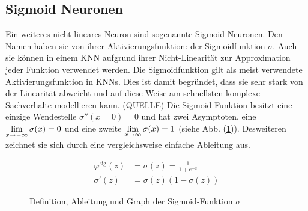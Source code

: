 \subsection{Sigmoid Neuronen}
Ein weiteres nicht-lineares Neuron sind sogenannte Sigmoid-Neuronen.
Den Namen haben sie von ihrer Aktivierungsfunktion: der Sigmoidfunktion $\sigma$.
\para{}
Auch sie können in einem KNN aufgrund ihrer Nicht-Linearität zur Approximation jeder Funktion
verwendet werden. Die Sigmoidfunktion gilt als meist verwendete
Aktivierungsfunktion in KNNs. Dies ist damit begründet, dass sie sehr stark von
der Linearität abweicht und auf diese Weise am schnellsten komplexe Sachverhalte
modellieren kann. (QUELLE)
\para{}
Die Sigmoid-Funktion besitzt eine einzige Wendestelle $\sigma''(x=0)=0$ und hat
zwei Asymptoten, eine $\displaystyle\lim_{x \to -\infty} \sigma(x)=0$
und eine zweite $\displaystyle\lim_{x \to \infty} \sigma(x)=1$ (siehe Abb.
(\ref{fig:sigmoid})). Desweiteren zeichnet sie sich durch eine vergleichsweise
einfache Ableitung aus.
\\
\begin{figure}[h!]
  \begin{minipage}[h!]{0.5\textwidth}
    \begin{align*}
      \varphi^{\text{sig}}(z) &= \sigma(z) = \frac{1}{1 + e^{-z}}\\
      \sigma'(z)&=\sigma(z)(1-\sigma(z))
    \end{align*}
  \end{minipage}
  \begin{minipage}[h!]{0.5\textwidth}
    \centering
  \end{minipage}
  \caption{Definition, Ableitung und Graph der Sigmoid-Funktion $\sigma$}
  \label{fig:sigmoid}
\end{figure}

